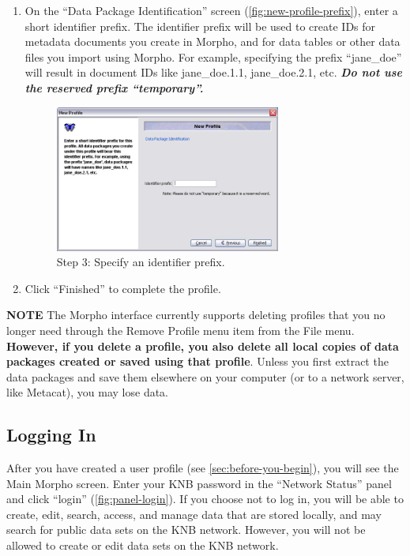 \begin{enumerate}
  \item On the ``Data Package Identification'' screen
    (\autoref{fig:new-profile-prefix}), enter a short identifier prefix.
    The identifier prefix will be used to create IDs for metadata
    documents you create in Morpho, and for data tables or other data
    files you import using Morpho. For example, specifying the prefix
    ``jane\_doe'' will result in document IDs like jane\_doe.1.1,
    jane\_doe.2.1, etc. \emph{\textbf{Do not use the reserved prefix
    ``temporary''.}}

  \begin{figure}
    \centering
      \includegraphics[width=0.7\textwidth]{images/new-profile-prefix.png}
    \caption{Step 3: Specify an identifier prefix.}
    \label{fig:new-profile-prefix}
  \end{figure}

  \item Click ``Finished'' to complete the profile.
\end{enumerate}

\begin{shaded}
  \textbf{NOTE} The Morpho interface currently supports deleting
  profiles that you no longer need through the Remove Profile menu item
  from the File menu. \textbf{However, if you delete a profile, you also
  delete all local copies of data packages created or saved using that
  profile}. Unless you first extract the data packages and save them
  elsewhere on your computer (or to a network server, like Metacat), you
  may lose data.
\end{shaded}

\subsection{Logging In}

After you have created a user profile (see
\autoref{sec:before-you-begin}), you will see the Main Morpho screen.
Enter your KNB password in the ``Network Status'' panel and click
``login'' (\autoref{fig:panel-login}). If you choose not to log in, you
will be able to create, edit, search, access, and manage data that are
stored locally, and may search for public data sets on the KNB network.
However, you will not be allowed to create or edit data sets on the KNB
network.

